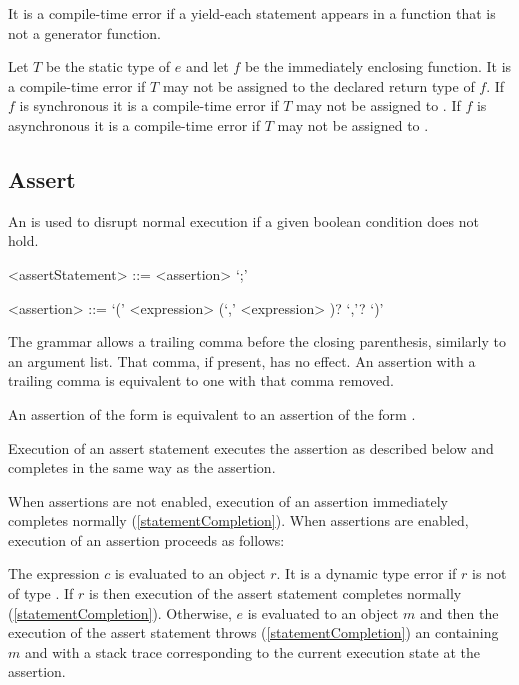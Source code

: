 \documentclass[makeidx]{article}
\begin{document}
{\LMHash{}%
It is a compile-time error if a yield-each statement appears
in a function that is not a generator function.

\LMHash{}%
Let $T$ be the static type of $e$ and let $f$ be
the immediately enclosing function.
It is a compile-time error if $T$ may not be assigned to
the declared return type of $f$.
If $f$ is synchronous it is a compile-time error
if $T$ may not be assigned to .
If $f$ is asynchronous it is a compile-time error
if $T$ may not be assigned to .


\subsection{Assert}

\LMHash{}%
An  is used to disrupt normal execution if a given boolean condition does not hold.

\begin{grammar}
<assertStatement> ::= <assertion> `;'

<assertion> ::= \ASSERT{} `(' <expression> (`,' <expression> )? `,'? `)'
\end{grammar}

\LMHash{}%
The grammar allows a trailing comma before the closing parenthesis,
similarly to an argument list.
That comma, if present, has no effect.
An assertion with a trailing comma is equivalent to one with that comma removed.

\LMHash{}%
An assertion of the form  is equivalent to an assertion of the form .

\LMHash{}%
Execution of an assert statement executes the assertion as described below
and completes in the same way as the assertion.

\LMHash{}%
When assertions are not enabled,
execution of an assertion immediately completes normally
(\ref{statementCompletion}).
When assertions are enabled,
execution of an assertion  proceeds as follows:

\LMHash{}%
The expression $c$ is evaluated to an object $r$.
It is a dynamic type error if $r$ is not of type .
If $r$ is \TRUE{} then execution of the assert statement completes normally (\ref{statementCompletion}).
Otherwise, $e$ is evaluated to an object $m$
and then the execution of the assert statement throws (\ref{statementCompletion}) an  containing $m$ and with a stack trace corresponding to the current execution state at the assertion.

}
\end{document}
